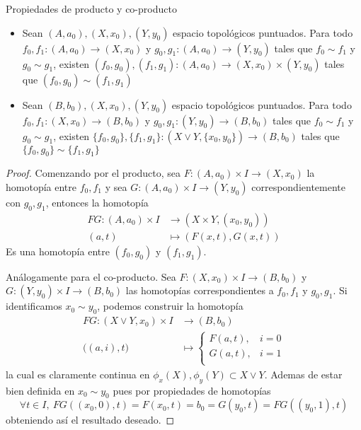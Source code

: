 \begin{teorema}
  Propiedades de producto y co-producto
  \begin{itemize}
    \item Sean \((A,a_0), (X,x_0), (Y,y_0)\) espacio topológicos
      puntuados. Para todo \(f_0, f_1 : (A,a_0) \to (X,x_0)\) y \(g_0,
      g_1 : (A, a_0) \to (Y,y_0)\) tales que \(f_0 \sim f_1 \) y \(g_0
      \sim g_1 \), existen \( (f_0, g_0), (f_1, g_1) : (A,a_0) \to (X,x_0)
      \times (Y,y_0)\) tales que \((f_0 , g_0) \sim (f_1 , g_1) \)
    \item Sean \((B,b_0), (X,x_0), (Y,y_0)\) espacio topológicos
      puntuados. Para todo \(f_0, f_1 : (X,x_0) \to (B,b_0) \) y \(g_0,
      g_1 : (Y, y_0) \to (B,b_0)\) tales que \(f_0 \sim f_1 \) y \(g_0
      \sim g_1 \), existen \( \{f_0, g_0\}, \{f_1, g_1\} : (X \vee
      Y,\{x_0,y_0\}) \to (B,b_0) \) tales que \(\{f_0 , g_0\} \sim \{f_1 ,
      g_1\} \)
  \end{itemize}
\end{teorema}
\begin{proof}
Comenzando por el producto, sea \(F : (A,a_0) \times I \to (X,x_0)\) la homotopía
entre \(f_0 , f_1\) y sea \(G : (A,a_0) \times I \to (Y,y_0)\)
correspondientemente con \(g_0, g_1\), entonces la homotopía
\begin{align*}
  FG : (A,a_0) \times I &\to \left( X \times Y , (x_0, y_0) \right) \\
       (a, t) &\mapsto (F(x,t) , G(x,t))
\end{align*}
Es una homotopía entre \((f_0 , g_0)\) y \((f_1 , g_1)\).

Análogamente para el co-producto. Sea \(F : (X,x_0) \times I \to
(B,b_0)\) y \(G : (Y,y_0) \times I \to (B,b_0)\) las homotopías
correspondientes a \(f_0 , f_1\) y \(g_0
, g_1\). Si identificamos \(x_0 \sim y_0\), podemos construir la homotopía
\begin{align*}
  FG : \left( X \vee Y , x_0 \right) \times I &\to (B, b_0) \\
  \big((a,i) , t \big) &\mapsto
                \begin{cases}
                  F(a,t), & i = 0 \\
                  G(a,t), & i = 1 \\
                \end{cases}
\end{align*}
la cual es claramente continua en \(\phi_x(X), \phi_y(Y) \subset X \vee
Y\). Ademas de estar bien definida en \(x_0 \sim y_0\) pues por
propiedades de homotopías
\[
  \forall t \in I,\ FG \left( (x_0,0) , t \right) = F (x_0, t) = b_0 =
  G(y_0, t) = FG \left( (y_0,1), t \right)
\]
obteniendo así el resultado deseado.
\end{proof}

